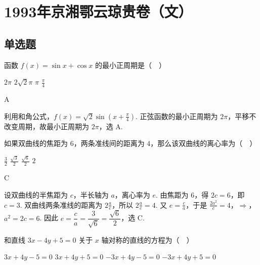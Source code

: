 \documentclass[UTF8,a4paper,oneside,11pt]{ctexbook}
\begin{document}
\mainmatter

\chapter{1993年京湘鄂云琼贵卷（文）}
\section{单选题}

\begin{problem}
函数 \(f(x)=\sin x+\cos x\) 的最小正周期是（\(\quad\)）

\choices
    {\(2\pi\)}
    {\(2\sqrt{2}\pi\)}
    {\(\pi\)}
    {\(\frac{\pi}{4}\)}
\end{problem}

\begin{answer}
A
\end{answer}

\begin{solution}
利用和角公式，\(f(x)=\sqrt{2}\sin\left(x+\frac{\pi}{4}\right)\). 正弦函数的最小正周期为 \(2\pi\)，平移不改变周期，故最小正周期为 \(2\pi\)，选 A.
\end{solution}

\begin{problem}
如果双曲线的焦距为 \(6\)，两条准线间的距离为 \(4\)，那么该双曲线的离心率为（\(\quad\)）

\choices
    {\(\frac{3}{2}\)}
    {\(\frac{\sqrt{3}}{2}\)}
    {\(\frac{\sqrt{6}}{2}\)}
    {\(2\)}
\end{problem}

\begin{answer}
C
\end{answer}

\begin{solution}
设双曲线的半焦距为 \(c\)，半长轴为 \(a\)，离心率为 \(e\). 由焦距为 \(6\)，得 \(2c=6\)，即 \(c=3\). 双曲线两条准线的距离为 \(2\frac{a}{e}\)，所以 \(2\frac{a}{e}=4\). 又 \(e=\frac{c}{a}\)，于是
\(\frac{2a^2}{c}=4\)，\(\Longrightarrow\)，\(a^2=2c=6\).
因此 \(e=\dfrac{c}{a}=\dfrac{3}{\sqrt{6}}=\dfrac{\sqrt{6}}{2}\)，选 C.
\end{solution}

\begin{problem}
和直线 \(3x-4y+5=0\) 关于 \(x\) 轴对称的直线的方程为（\(\quad\)）

\choices
    {\(3x+4y-5=0\)}
    {\(3x+4y+5=0\)}
    {\(-3x+4y-5=0\)}
    {\(-3x+4y+5=0\)}
\end{problem}
\end{document}
